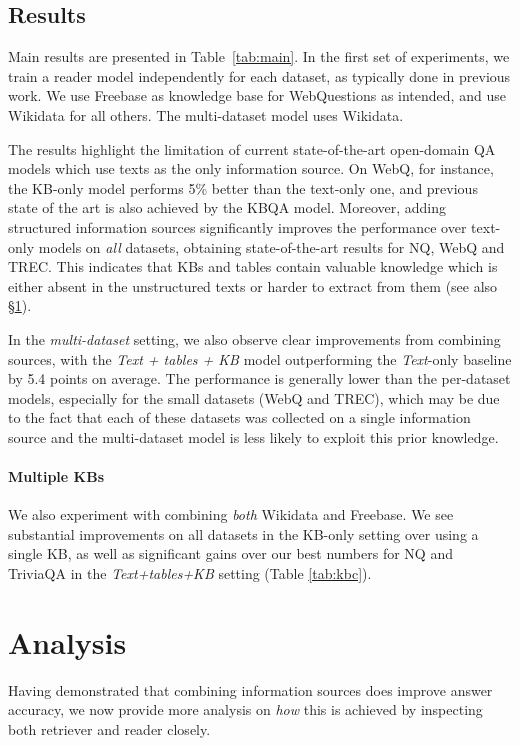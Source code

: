 \documentclass[11pt]{article}
\newcommand{\secref}[1]{\S\ref{#1}}
\begin{document}
\subsection{Results}\label{sec:exp:results}

Main results are presented in Table~\ref{tab:main}. 
In the first set of experiments, we train a reader model independently for each dataset, as typically done in previous work. We use Freebase as knowledge base for WebQuestions as intended, and use Wikidata for all others.  The multi-dataset model uses Wikidata.

The results highlight the limitation of current state-of-the-art open-domain QA models which use texts as the only information source.
On WebQ, for instance, the KB-only model performs 5\% better than the text-only one, and previous state of the art is also achieved by the KBQA model.
Moreover, adding structured information sources significantly improves the performance over text-only models on \emph{all} datasets, obtaining state-of-the-art results for NQ, WebQ and TREC.
This indicates that KBs and tables contain valuable knowledge which is either absent in the unstructured texts or harder to extract from them (see also \secref{sec:analysis}).

In the \emph{multi-dataset} setting, we also observe clear improvements from combining sources, with the \emph{Text + tables + KB} model outperforming the \emph{Text}-only baseline by 5.4 points on average.
The performance is generally lower than the per-dataset models, especially for the small datasets (WebQ and TREC), which may be due to the fact that each of these datasets was collected on a single information source and the multi-dataset model is less likely to exploit this prior knowledge.

\paragraph{Multiple KBs} 
We also experiment with combining \emph{both} Wikidata and Freebase.  We see substantial improvements on all datasets in the KB-only setting over using a single KB, as well as significant gains over our best numbers for NQ and TriviaQA in the \emph{Text+tables+KB} setting (Table \ref{tab:kbc}).

\section{Analysis}\label{sec:analysis}

Having demonstrated that combining information sources does improve answer accuracy, we now provide more analysis on \emph{how} this is achieved
by inspecting both retriever and reader closely.
\end{document}
